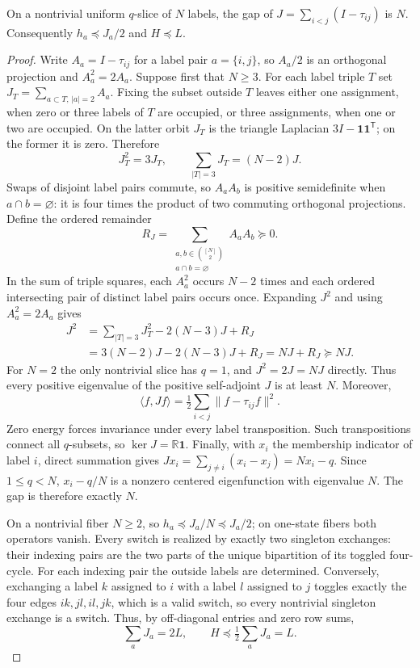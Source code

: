 \begin{lemma}\label{joh:gap}
On a nontrivial uniform $q$-slice of $N$ labels, the gap of
$J=\sum_{i<j}(I-\tau_{ij})$ is $N$. Consequently $h_a\preceq J_a/2$ and
$H\preceq L$.
\end{lemma}
\begin{proof}
Write $A_a=I-\tau_{ij}$ for a label pair $a=\{i,j\}$, so $A_a/2$ is an
orthogonal projection and $A_a^2=2A_a$. Suppose first that $N\ge3$.
For each label triple $T$ set $J_T=\sum_{a\subset T,\,|a|=2}A_a$.
Fixing the subset outside $T$ leaves either one assignment, when zero or
three labels of $T$ are occupied, or three assignments, when one or two
are occupied. On the latter orbit $J_T$ is the triangle Laplacian
$3I-\mathbf 1\mathbf 1^{\mathsf T}$; on the former it is zero. Therefore
\[
 J_T^2=3J_T,\qquad \sum_{|T|=3}J_T=(N-2)J.
\]
Swaps of disjoint label pairs commute, so $A_aA_b$ is positive
semidefinite when $a\cap b=\varnothing$: it is four times the product
of two commuting orthogonal projections. Define the ordered remainder
\[
 R_J=\sum_{\substack{a,b\in\binom{[N]}2\\a\cap b=\varnothing}}A_aA_b
 \succeq0.
\]
In the sum of triple squares, each $A_a^2$ occurs $N-2$ times and each
ordered intersecting pair of distinct label pairs occurs once. Expanding
$J^2$ and using $A_a^2=2A_a$ gives
\[
 \begin{aligned}
 J^2&=\sum_{|T|=3}J_T^2-2(N-3)J+R_J\\
    &=3(N-2)J-2(N-3)J+R_J=NJ+R_J\succeq NJ.
 \end{aligned}
\]
For $N=2$ the only nontrivial slice has $q=1$, and $J^2=2J=NJ$ directly.
Thus every positive eigenvalue of the positive self-adjoint $J$ is at least
$N$. Moreover,
\[
 \langle f,Jf\rangle=\tfrac12\sum_{i<j}\lVert f-\tau_{ij}f\rVert^2.
\]
Zero energy forces invariance under every label transposition. Such
transpositions connect all $q$-subsets, so $\ker J=\mathbb R\mathbf 1$.
Finally, with $x_i$ the membership indicator of label $i$, direct summation
gives $Jx_i=\sum_{j\ne i}(x_i-x_j)=Nx_i-q$. Since $1\le q<N$,
$x_i-q/N$ is a nonzero centered eigenfunction with eigenvalue $N$.
The gap is therefore exactly $N$.

On a nontrivial fiber $N\ge2$, so $h_a\preceq J_a/N\preceq J_a/2$;
on one-state fibers both operators vanish. Every switch is realized by
exactly two singleton exchanges: their indexing pairs are the two parts of
the unique bipartition of its toggled four-cycle. For each indexing pair the
outside labels are determined. Conversely, exchanging a label $k$ assigned
to $i$ with a label $l$ assigned to $j$ toggles exactly the four edges
$ik,jl,il,jk$, which is a valid switch, so every nontrivial singleton
exchange is a switch. Thus, by off-diagonal entries and zero row sums,
\begin{equation}\label{joh:multiplicity}
 \sum_a J_a=2L,\qquad H\preceq\tfrac12\sum_aJ_a=L.
\end{equation}
\end{proof}

